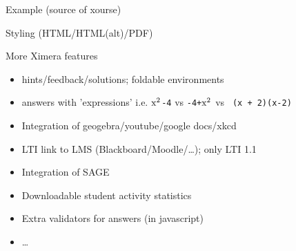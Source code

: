 \begin{frame}{Example (source of xourse)}
  \vspace{-0.3cm}
  \begin{center}
  \end{center}
\end{frame}


\begin{frame}[t]{Styling (HTML/HTML(alt)/PDF)}
  \begin{center}
  \end{center}
\end{frame}

\begin{frame}{More Ximera features}
  \begin{itemize}
  \item hints/feedback/solutions; foldable environments
  \item answers with 'expressions' i.e. \texttt{$\rm{x}^2$-4} \quad vs \quad \texttt{-4+$\rm{x}^2$} \quad vs \quad \texttt{ (x  +  2)(x-2)}
  \item Integration of geogebra/youtube/google docs/xkcd
  \item LTI link to LMS (Blackboard/Moodle/\ldots); only LTI 1.1
  \item Integration of SAGE
  \item Downloadable student activity statistics
  \item Extra validators for answers (in javascript)
  \item \ldots
  \end{itemize}
\end{frame}

